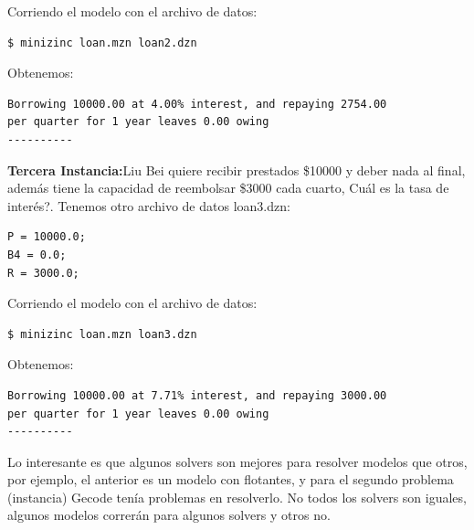 \documentclass[12pt]{article}
\begin{document}
\begin{justify}
Corriendo el modelo con el archivo de datos:
\end{justify}

\begin{Verbatim}
$ minizinc loan.mzn loan2.dzn
\end{Verbatim}

\begin{justify}
Obtenemos:
\end{justify}

\begin{Verbatim}
Borrowing 10000.00 at 4.00% interest, and repaying 2754.00
per quarter for 1 year leaves 0.00 owing
----------
\end{Verbatim}

\begin{justify}
\textbf{Tercera Instancia:}Liu Bei quiere recibir prestados \$10000 y deber nada al final, además tiene la capacidad de reembolsar \$3000 cada cuarto, Cuál es la tasa de interés?. Tenemos otro archivo de datos loan3.dzn:
\end{justify}

\begin{Verbatim}
P = 10000.0;
B4 = 0.0;
R = 3000.0;
\end{Verbatim}

\begin{justify}
Corriendo el modelo con el archivo de datos:
\end{justify}

\begin{Verbatim}
$ minizinc loan.mzn loan3.dzn
\end{Verbatim}

\begin{justify}
Obtenemos:
\end{justify}

\begin{Verbatim}
Borrowing 10000.00 at 7.71% interest, and repaying 3000.00
per quarter for 1 year leaves 0.00 owing
----------
\end{Verbatim}

\begin{justify}
Lo interesante es que algunos solvers son mejores para resolver modelos que otros, por ejemplo, el anterior es un modelo con flotantes, y para el segundo problema (instancia) Gecode tenía problemas en resolverlo. No todos los solvers son iguales, algunos modelos correrán para algunos solvers y otros no.
\end{justify}
\end{document}
